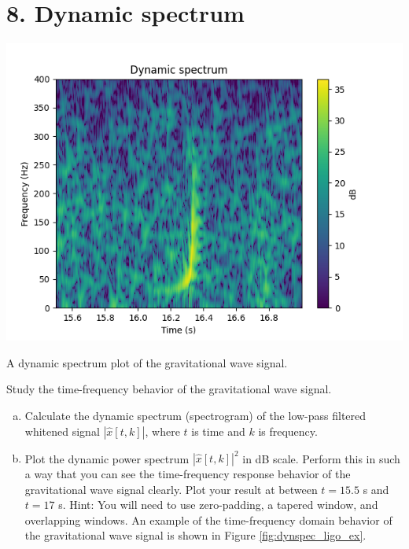 \section{8. Dynamic spectrum}

\begin{marginfigure}
\begin{center}
\includegraphics[width=\textwidth]{Assignments/figures/dynspec.png}
\end{center}
\caption{A dynamic spectrum plot of the gravitational wave signal.}
\label{fig:dynspec_ligo_ex}
\end{marginfigure}

Study the time-frequency behavior of the gravitational wave signal.
\begin{enumerate}[a)]
  
\item Calculate the dynamic spectrum (spectrogram) of the low-pass
  filtered whitened signal $|\hat{x}[t,k]|$, where $t$ is time and $k$
  is frequency.

\item Plot the dynamic power spectrum $|\hat{x}[t,k]|^2$ in dB scale. Perform this in such a way that you can see the time-frequency response behavior of the gravitational wave signal clearly. Plot your result at between $t=15.5$ s and $t=17$ s. Hint: You will need to use zero-padding, a tapered window, and overlapping windows. An example of the time-frequency domain behavior of the gravitational wave signal is shown in Figure \ref{fig:dynspec_ligo_ex}.

  
\end{enumerate}


